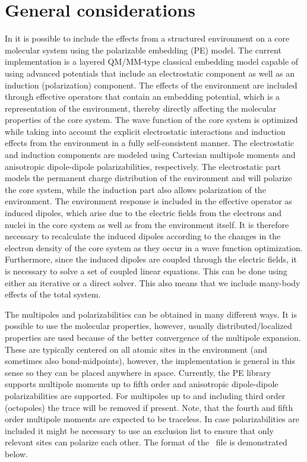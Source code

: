 \section{General considerations}
In {\dalton} it is possible to include the effects from a structured
environment on a core molecular system using the polarizable embedding (PE)
model. The current implementation is a layered QM/MM-type classical embedding model
capable of using advanced potentials that include an electrostatic component as
well as an induction (polarization) component. The effects of the environment
are included through effective operators that contain an embedding potential,
which is a representation of the environment, thereby directly affecting the
molecular properties of the core system. The wave function of the core system
is optimized while taking into account the explicit electrostatic interactions
and induction effects from the environment in a fully self-consistent manner.
The electrostatic and induction components are modeled using Cartesian
multipole moments and anisotropic dipole-dipole polarizabilities, respectively.
The electrostatic part models the permanent charge distribution of the
environment and will polarize the core system, while the induction part also
allows polarization of the environment. The environment response is included in
the effective operator as induced dipoles, which arise due to the electric
fields from the electrons and nuclei in the core system as well as from the
environment itself. It is therefore necessary to recalculate the induced dipoles
according to the changes in the electron density of the core system as they
occur in a wave function optimization. Furthermore, since the induced dipoles
are coupled through the electric fields, it is necessary to solve a set of
coupled linear equations. This can be done using either an iterative or a
direct solver. This also means that we include many-body effects of the total system.

The multipoles and polarizabilities can be obtained in many different ways. It
is possible to use the molecular properties, however, usually
distributed/localized properties are used because of the better convergence of
the multipole expansion. These are typically centered on all atomic sites in
the environment (and sometimes also bond-midpoints), however, the
implementation is general in this sense so they can be placed anywhere in
space. Currently, the PE library supports multipole moments up to fifth order and
anisotropic dipole-dipole polarizabilities are supported. For multipoles up to and
including third order (octopoles) the trace will be removed if present. Note, that
the fourth and fifth order multipole moments are expected to be traceless. In case
polarizabilities are included it might be necessary to use an exclusion list
to ensure that only relevant sites can polarize each other. The format of
the \potinp\ file is demonstrated below.

